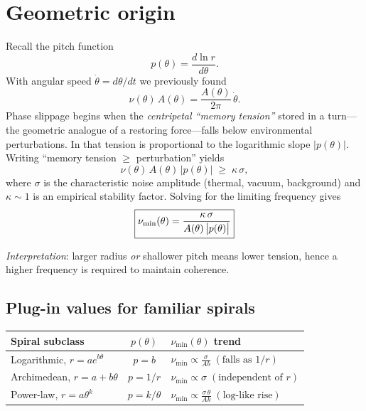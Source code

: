 \section{Geometric origin}
Recall the pitch function
\[
  p(\theta)=\frac{d\!\ln r}{d\theta}.
\]
With angular speed \(\dot\theta=d\theta/dt\) we previously found
\[
  \nu(\theta)\,A(\theta)
    =\frac{A(\theta)}{2\pi}\,\dot\theta .
\]
Phase slippage begins when the \emph{centripetal “memory tension”} stored in a turn—the geometric analogue of a restoring force—falls below environmental perturbations.  
In \RCM{} that tension is proportional to the logarithmic slope \(\lvert p(\theta)\rvert\).  
Writing “memory tension \(\ge\) perturbation” yields
\[
  \nu(\theta)\,A(\theta)\,\bigl|p(\theta)\bigr|
    \;\ge\;\kappa\,\sigma ,
\]
where \(\sigma\) is the characteristic noise amplitude (thermal, vacuum, background) and \(\kappa\sim1\) is an empirical stability factor.  
Solving for the limiting frequency gives
\[
  \boxed{%
    \nu_{\min}(\theta)=\frac{\kappa\,\sigma}
                           {A(\theta)\,\bigl|p(\theta)\bigr|}}
\]  %

\emph{Interpretation}: larger radius \emph{or} shallower pitch means lower tension, hence a higher frequency is required to maintain coherence.

\subsection{Plug-in values for familiar spirals}
\begin{center}
\renewcommand{\arraystretch}{1.2}
\begin{tabular}{@{}lcl@{}}
\toprule
\textbf{Spiral subclass} & $p(\theta)$ & $\nu_{\min}(\theta)$ trend\\
\midrule
Logarithmic, $r = a e^{b\theta}$ & $p = b$ &
  $\displaystyle \nu_{\min}\propto \frac{\sigma}{A b}\;(\text{falls as }1/r)$\\
Archimedean, $r = a + b\theta$ & $p = 1/r$ &
  $\displaystyle \nu_{\min}\propto \sigma\;(\text{independent of }r)$\\
Power-law, $r = a \theta^{k}$ & $p = k/\theta$ &
  $\displaystyle \nu_{\min}\propto \frac{\sigma\,\theta}{A k}\;(\text{log-like rise})$\\
\bottomrule
\end{tabular}
\end{center}

